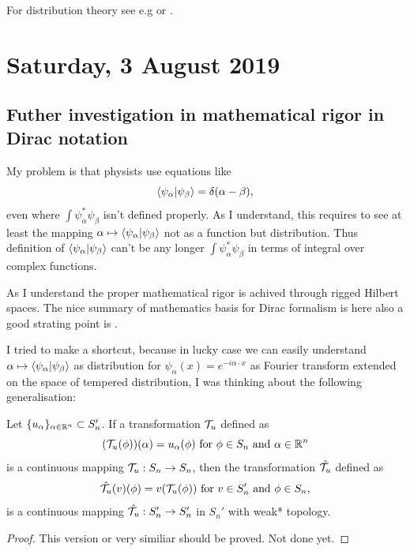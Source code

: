 \documentclass[main.tex]{subfiles}
\begin{document}
For distribution theory see e.g \cite[Distributions and Fourier Transforms]{rudin1991} or \cite[3.3 Distributions]{miklavcic1998}.
\section{Saturday, 3 August 2019}
\subsection{Futher investigation in mathematical rigor in Dirac notation}

My problem is that physists use equations like
\begin{equation}
\braket{\psi_\alpha}{\psi_\beta} = \delta(\alpha - \beta),
\end{equation}
even where $\int \psi_\alpha^* \psi_\beta$ isn't defined properly. As I understand, this requires to see at least the mapping $\alpha \mapsto \braket{\psi_\alpha}{\psi_\beta}$ not as a function but distribution. Thus definition of $\braket{\psi_\alpha}{\psi_\beta}$ can't be any longer $\int \psi_\alpha^* \psi_\beta$ in terms of integral over complex functions.

As I understand the proper mathematical rigor is achived through rigged Hilbert spaces. The nice summary of mathematics basis for Dirac formalism is here \cite{gadella2003} also a good strating point is \cite{madrid2005}.

I tried to make a shortcut, because in lucky case we can easily understand $\alpha\mapsto \braket{\psi_\alpha}{\psi_\beta}$ as distribution for $\psi_\alpha(x) = e^{-i\alpha\cdot x}$ as Fourier transform extended on the space of tempered distribution, I was thinking about the following generalisation:

\begin{theorem}
\label{continous-basis-helper}
Let $\{u_\alpha\}_{\alpha\in\mathbb{R}^n} \subset S'_n$. If a transformation $\mathcal{T}_u$ defined as
\begin{equation}
(\mathcal{T}_u(\phi))(\alpha) = u_\alpha(\phi) \text{ for } \phi\in S_n \text{ and } \alpha\in\mathbb{R}^n
\end{equation}
is a continuous mapping $\mathcal{T}_u:S_n\to S_n$, then the transformation $\hat{\mathcal{T}_u}$ defined as
\begin{equation}
\hat{\mathcal{T}_u}(v)(\phi) = v(\mathcal{T}_u(\phi)) \text{ for } v\in S_n' \text{ and } \phi\in S_n, 
\end{equation}
is a continuous mapping $\hat{\mathcal{T}_u}:S_n'\to S'_n$ in $S_n'$ with weak* topology.
\end{theorem}
\begin{proof}
This version or very similiar should be proved. Not done yet.
\end{proof}
\end{document}
